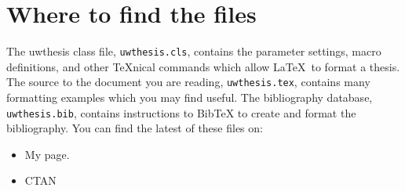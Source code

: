 \documentclass [11pt, proquest] {uwthesis}[2015/03/03]
\begin{document}
%
%
\nocite{*}   %


%
%
\appendix
\raggedbottom\sloppy
 
 
\chapter{Where to find the files}
 
The uwthesis class file, {\tt uwthesis.cls}, contains the parameter settings,
macro definitions, and other \TeX nical commands which
allow \LaTeX\ to format a thesis.  
The source to
the document you are reading, {\tt uwthesis.tex},
contains many formatting examples
which you may find useful.
The bibliography database, {\tt uwthesis.bib}, contains instructions
to BibTeX to create and format the bibliography.
You can find the latest of these files on:

\begin{itemize}
\item My page.
\begin{description}
\item[] \verb%http://staff.washington.edu/fox/tex/uwthesis.html%
\end{description}

\item CTAN

\end{itemize}

\end{document}
